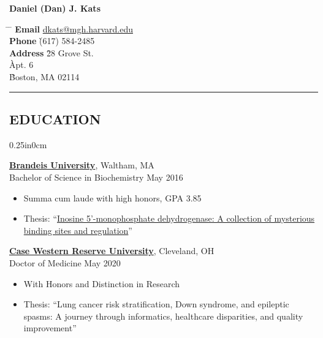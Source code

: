 \documentclass[11pt]{article}
\makeatletter
\newcommand{\myname}{Daniel (Dan) J. Kats}
\newcommand{\myemail}{dkats@mgh.harvard.edu}
\newcommand{\myemailhref}{\href{mailto:\myemail}{\myemail}}
\newcommand{\myphone}{(617) 584-2485}
\newcommand{\mysec}[1]{\subsection*{\uppercase{#1}}}
\newcommand{\blockindent}{0.25in}
\renewcommand{\title}[1]{
{\huge{\textbf{#1}}}\\
}
\newcommand{\school}[4]{
\textbf{#1}, {#2} \\
{#3} \hfill {#4}\\
}
\makeatother
\begin{document}
\parbox{0.5\textwidth}{
	\vspace*{-0.5cm}
	\title{\myname}
}
\hfill
{\fontsize{10pt}{11.5pt}\selectfont
	\parbox{0.3\textwidth}{
		\vspace*{-1.0cm}
		\begin{tabbing}
		\hspace{3cm}	\= \hspace{4cm} \= \kill %
		{\bf Email}	\` \myemailhref \\
		{\bf Phone}	\` \myphone \\
		{\bf Address} 	\` 28 Grove St.\\
						\` Apt. 6\\
						\` Boston, MA 02114\\
		\end{tabbing}
		\vspace*{-8mm}
	}
}
\rule{\textwidth}{0.5mm}


\vspace{-0.5mm}
\mysec{Education}
\begin{adjustwidth}{\blockindent}{0cm}
\school{\href{http://www.brandeis.edu/}{\textbf{Brandeis University}}}{Waltham, MA}{Bachelor of Science in Biochemistry}{May 2016}
\begin{itemize}

	\item Summa cum laude with high honors, GPA 3.85

	\item Thesis: ``\href{http://hdl.handle.net/10192/32359}{Inosine 5'-monophosphate dehydrogenase: A collection of mysterious binding sites and regulation}''

\end{itemize}

\school{\href{http://www.case.edu/}{\textbf{Case Western Reserve University}}}{Cleveland, OH}{Doctor of Medicine}{May 2020}
\begin{itemize}

	\item With Honors and Distinction in Research

	\item Thesis: ``Lung cancer risk stratification, Down syndrome, and epileptic spasms: A journey through informatics, healthcare disparities, and quality improvement''

\end{itemize}

\end{adjustwidth}
\end{document}
